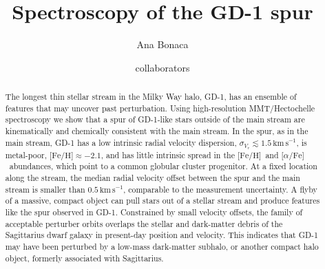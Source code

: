 \documentclass[twocolumn]{aastex63}
\newcommand{\kms}{\ensuremath{\textrm{km}\,\textrm{s}^{-1}}}
\newcommand{\feh}{\ensuremath{\textrm{[Fe/H]}}}
\newcommand{\afe}{\ensuremath{\textrm{[$\alpha$/Fe]}}}
\begin{document}
\sloppy\sloppypar\raggedbottom\frenchspacing %

\title{Spectroscopy of the GD-1 spur}


\author[0000-0002-7846-9787]{Ana Bonaca}

\author{collaborators}


% 
% 

\begin{abstract}\noindent %
The longest thin stellar stream in the Milky Way halo, GD-1, has an ensemble of features that may uncover past perturbation.
Using high-resolution MMT/Hectochelle spectroscopy we show that a spur of GD-1-like stars outside of the main stream are kinematically and chemically consistent with the main stream.
In the spur, as in the main stream, GD-1 has a low intrinsic radial velocity dispersion, $\sigma_{V_r}\lesssim1.5\,\kms$, is metal-poor, $\feh\approx-2.1$, and has little intrinsic spread in the \feh\ and \afe\ abundances, which point to a common globular cluster progenitor.
At a fixed location along the stream, the median radial velocity offset between the spur and the main stream is smaller than $0.5\,\kms$, comparable to the measurement uncertainty.
A flyby of a massive, compact object can pull stars out of a stellar stream and produce features like the spur observed in GD-1.
Constrained by small velocity offsets, the family of acceptable perturber orbits overlaps the stellar and dark-matter debris of the Sagittarius dwarf galaxy in present-day position and velocity.
This indicates that GD-1 may have been perturbed by a low-mass dark-matter subhalo, or another compact halo object, formerly associated with Sagittarius.
\end{abstract}
\end{document}
